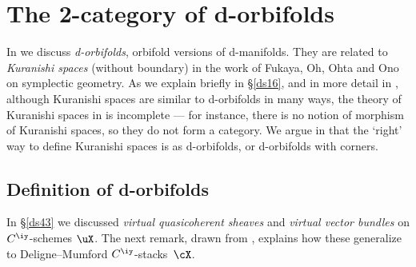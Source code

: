 \documentclass{article}
\begin{document}
\section{The 2-category of d-orbifolds}
\label{ds11}

In \cite[Chap.~10]{Joyc6} we discuss {\it d-orbifolds}, orbifold
versions of d-manifolds. They are related to {\it Kuranishi
spaces\/} (without boundary) in
the work of Fukaya, Oh, Ohta and Ono \cite{FuOn,FOOO} on symplectic
geometry. As we explain briefly in \S\ref{ds16}, and in more detail
in \cite[\S 14.3]{Joyc6}, although Kuranishi spaces are similar to
d-orbifolds in many ways, the theory of Kuranishi spaces in
\cite{FuOn,FOOO} is incomplete --- for instance, there is no notion
of morphism of Kuranishi spaces, so they do not form a category. We
argue in \cite[\S 14.3]{Joyc6} that the `right' way to define
Kuranishi spaces is as d-orbifolds, or d-orbifolds with corners.

\subsection{Definition of d-orbifolds}
\label{ds111}

In \S\ref{ds43} we discussed {\it virtual quasicoherent sheaves\/}
and {\it virtual vector bundles\/} on $C^\iy$-schemes $\uX$. The
next remark, drawn from \cite[\S 10.1.1]{Joyc6}, explains how these
generalize to Deligne--Mumford $C^\iy$-stacks~$\cX$.
\end{document}
